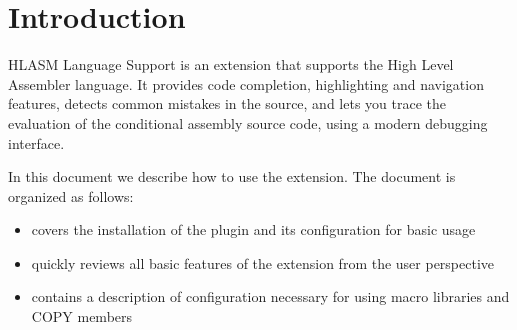 \section*{Introduction}

HLASM Language Support is an extension that supports the High Level Assembler language. It provides code completion, highlighting and navigation features, detects common mistakes in the source, and lets you trace the evaluation of the conditional assembly source code, using a modern debugging interface.

In this document we describe how to use the extension. The document is organized as follows:
\begin{itemize}
\item{} covers the installation of the plugin and its configuration for basic usage
\item{} quickly reviews all basic features of the extension from the user perspective
\item{} contains a description of configuration necessary for using macro libraries and COPY members
\end{itemize}
